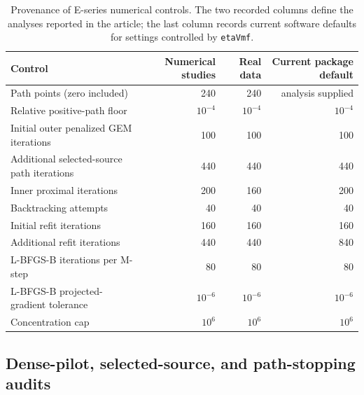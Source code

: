 \documentclass[preprint,12pt,authoryear]{elsarticle}
\begin{document}
\begin{table}[H]
\centering
\scriptsize
\setlength{\tabcolsep}{5pt}
\caption{Provenance of E-series numerical controls. The two recorded columns
define the analyses reported in the article; the last column records current
software defaults for settings controlled by \texttt{etaVmf}.}
\label{tab:s-control-provenance}
\begin{tabular}{lrrr}
\toprule
Control & Numerical studies & Real data & Current package default \\
\midrule
Path points (zero included) & 240 & 240 & analysis supplied \\
Relative positive-path floor & $10^{-4}$ & $10^{-4}$ & $10^{-4}$ \\
Initial outer penalized GEM iterations & 100 & 100 & 100 \\
Additional selected-source path iterations & 440 & 440 & 440 \\
Inner proximal iterations & 200 & 160 & 200 \\
Backtracking attempts & 40 & 40 & 40 \\
Initial refit iterations & 160 & 160 & 160 \\
Additional refit iterations & 440 & 440 & 840 \\
L-BFGS-B iterations per M-step & 80 & 80 & 80 \\
L-BFGS-B projected-gradient tolerance & $10^{-6}$ & $10^{-6}$ & $10^{-6}$ \\
Concentration cap & $10^6$ & $10^6$ & $10^6$ \\
\bottomrule
\end{tabular}
\end{table}

\subsection{Dense-pilot, selected-source, and path-stopping audits}
\label{sec:s-heuristic-audit}
\end{document}
